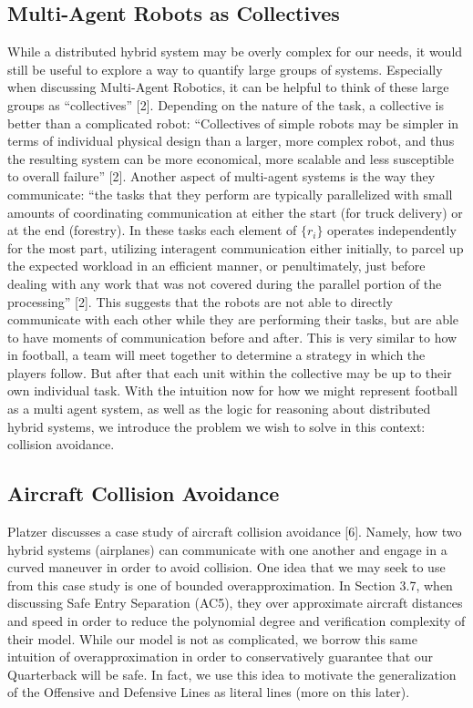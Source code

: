 \subsection{Multi-Agent Robots as Collectives}
\quad While a distributed hybrid system may be overly complex for our needs, it would still be useful to explore a way to quantify large groups of systems. Especially when discussing Multi-Agent Robotics, it can be helpful to think of these large groups as “collectives” [2]. Depending on the nature of the task, a collective is better than a complicated robot: “Collectives of simple robots may be simpler in terms of individual physical design than a larger, more complex robot, and thus the resulting system can be more economical, more scalable and less susceptible to overall failure” [2]. Another aspect of multi-agent systems is the way they communicate: “the tasks that they perform are typically parallelized with small amounts of coordinating communication at either the start (for truck delivery) or at the end (forestry). In these tasks each element of $\{r_i\}$ operates independently for the most part, utilizing interagent communication either initially, to parcel up the expected workload in an efficient manner, or penultimately, just before dealing with any work that was not covered during the parallel portion of the processing” [2]. This suggests that the robots are not able to directly communicate with each other while they are performing their tasks, but are able to have moments of communication before and after. This is very similar to how in football, a team will meet together to determine a strategy in which the players follow. But after that each unit within the collective may be up to their own individual task. With the intuition now for how we might represent football as a multi agent system, as well as the logic for reasoning about distributed hybrid systems, we introduce the problem we wish to solve in this context: collision avoidance.

\newpage

\subsection{Aircraft Collision Avoidance}
\quad Platzer discusses a case study of aircraft collision avoidance [6]. Namely, how two hybrid systems (airplanes) can communicate with one another and engage in a curved maneuver in order to avoid collision. One idea that we may seek to use from this case study is one of bounded overapproximation. In Section 3.7, when discussing Safe Entry Separation (AC5), they over approximate aircraft distances and speed in order to reduce the polynomial degree and verification complexity of their model. While our model is not as complicated, we borrow this same intuition of overapproximation in order to conservatively guarantee that our Quarterback will be safe. In fact, we use this idea to motivate the generalization of the Offensive and Defensive Lines as literal lines (more on this later). \\ 

